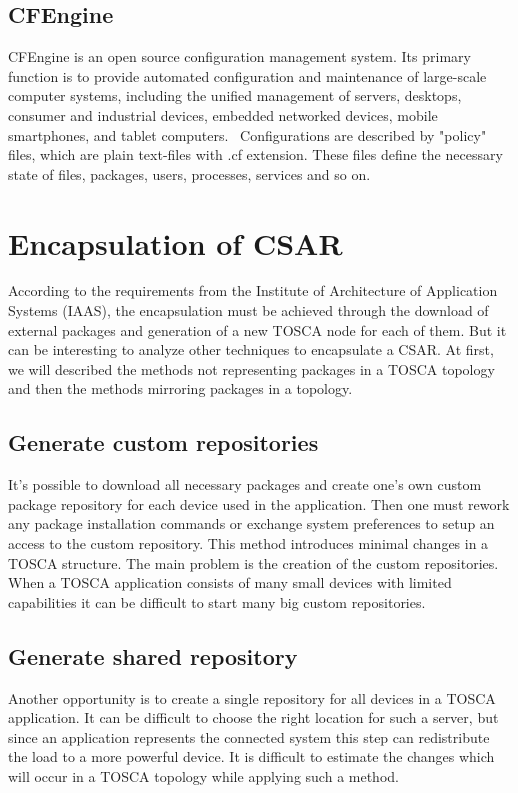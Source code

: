 \subsection*{CFEngine}
CFEngine is an open source configuration management system.
Its primary function is to provide automated configuration and maintenance of large-scale computer systems, including the unified management of servers, desktops, consumer and industrial devices, embedded networked devices, mobile smartphones, and tablet computers.~\cite{cfengine}
Configurations are described by "policy" files, which are plain text-files with .cf extension.
These files define the necessary state of files, packages, users, processes, services and so on.~\cite{cfengine2}

\section{Encapsulation of CSAR}
According to the requirements from the Institute of Architecture of Application Systems (IAAS), the encapsulation must be achieved through the download of external packages and generation of a new TOSCA node for each of them. 
But it can be interesting to analyze other techniques to encapsulate a CSAR. 
At first, we will described the methods not representing packages in a TOSCA topology and then the methods mirroring packages in a topology.\\

\subsection*{Generate custom repositories}
It's possible to download all necessary packages and create one's own custom package repository for each device used in the application. 
Then one must rework any package installation commands or exchange system preferences to setup an access to the custom repository.
This method introduces minimal changes in a TOSCA structure.
The main problem is the creation of the custom repositories. 
When a TOSCA application consists of many small devices with limited capabilities it can be difficult to start many big custom repositories.

\subsection*{Generate shared repository}
Another opportunity is to create a single repository for all devices in a TOSCA application.
It can be difficult to choose the right location for such a server, but since an application represents the connected system this step can redistribute the load to a more powerful device.
It is difficult to estimate the changes which will occur in a TOSCA topology while applying such a method.


